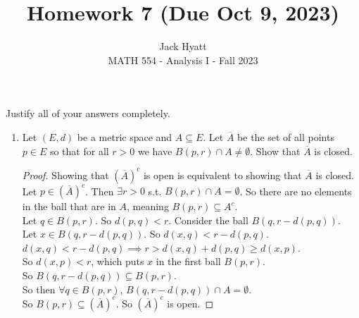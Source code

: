 \documentclass[14pt]{extarticle}
\begin{document}
	
	
	
	\title{Homework 7 (Due Oct 9, 2023)}
	\author{Jack Hyatt\\ %
		MATH 554 - Analysis I - Fall 2023} 
	
	\maketitle
	
	Justify all of your answers completely.\\
	
	
	\medskip 
	
	\begin{enumerate}
		\item Let $(E,d)$ be a metric space and $A \subseteq E$. Let $\overline{A}$ be the set of all points $p \in E$ so that for all $r > 0$ we have $B(p,r) \cap A \neq \emptyset$. Show that $\overline{A}$ is closed.
		\begin{proof}
			Showing that $(\overline{A})^c$ is open is equivalent to showing that $\overline{A}$ is closed.\\
			Let $p \in (\overline{A})^c$. Then $\exists r>0$ s.t. $B(p,r) \cap A = \emptyset$. So there are no elements in the ball that are in $A$, meaning $B(p,r) \subseteq A^c$.\\
			Let $q \in B(p,r)$. So $d(p,q)<r$. Consider the ball $B(q,r-d(p,q))$.\\
			Let $x \in B(q,r-d(p,q))$. So $d(x,q) < r-d(p,q)$.\\
			$d(x,q) < r-d(p,q) \implies r > d(x,q) + d(p,q) \geq d(x,p)$.\\
			So $d(x,p)<r$, which puts $x$ in the first ball $B(p,r)$.\\
			So $B(q,r-d(p,q)) \subseteq B(p,r)$.\\
			So then $\forall q \in B(p,r)$, $B(q,r-d(p,q)) \cap A = \emptyset$.\\
			So $B(p,r) \subseteq (\overline{A})^c$. So  $(\overline{A})^c$ is open.
		\end{proof}
		

\end{enumerate}
\end{document}
